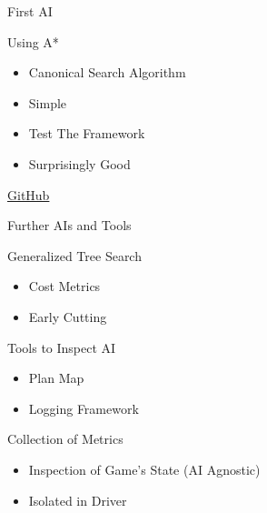 \documentclass[presentation,bigger]{beamer}
\begin{document}
\begin{frame}[label={sec:orgb45ae64}]{First AI}
\begin{block}{Using A*}
\begin{itemize}
\item Canonical Search Algorithm
\item Simple
\item Test The Framework
\item Surprisingly Good
\end{itemize}


\vfill
\vfill
\begin{flushright}
\color{blue}\href{https://github.com/unDeadHerbs/Snek\_player/blob/79c6553/snek\_main.cpp\#L62}{GitHub}
\end{flushright}
\end{block}
\end{frame}
\begin{frame}[label={sec:orgc2eb8fe}]{Further AIs and Tools}
\begin{block}{Generalized Tree Search}
\begin{itemize}
\item Cost Metrics
\item Early Cutting
\end{itemize}
\end{block}
\begin{block}{Tools to Inspect AI}
\begin{itemize}
\item Plan Map
\item Logging Framework
\end{itemize}
\end{block}
\begin{block}{Collection of Metrics}
\begin{itemize}
\item Inspection of Game's State (AI Agnostic)
\item Isolated in Driver
\end{itemize}
\end{block}
\end{frame}
\end{document}
